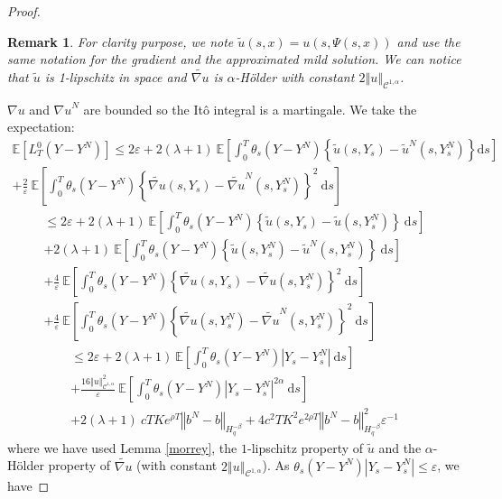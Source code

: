 \documentclass[12pt]{article}
\newtheorem{rem}{Remark}
\newcommand{\norme}[1]{\left\Vert #1\right\Vert}
\newcommand{\E}{\mathbb{E}}
\newcommand{\di}{\mathrm{d}}
\begin{document}
\begin{proof}
\begin{rem}  
    For clarity purpose, we note $\tilde{u}\left(s,x\right) = u\left(s,\Psi\left(s,x\right)\right)$ and use the same notation for the gradient and the approximated mild solution. We can notice that $\tilde{u}$ is 1-lipschitz in space and $\widetilde{\nabla u}$ is $\alpha$-Hölder with constant $2\norme{u}_{\mathcal{C}^{1,\alpha}}$.
\end{rem}
${\nabla u}$ and ${\nabla u}^N$ are bounded so the Itô integral is a martingale. We take the expectation:
    \begin{multline*}
    \E\left[L^0_T(Y-Y^N)\right] \leq 2\varepsilon + 2(\lambda + 1)\ \E\left[\int_0^T\theta_s(Y-Y^N)\left\{\widetilde{u}\left(s,Y_s\right)-\widetilde{u}^N\left(s,Y_s^N\right)\right\} \di s \right]\\
    +\frac{2}{\varepsilon}\ \E\left[\int_0^T \theta_s(Y-Y^N)\left\{\widetilde{\nabla u}\left(s,Y_s\right)-{\widetilde{\nabla u}^N}\left(s,Y_s^N\right)\right\}^2\ \di s\right]
    \end{multline*}
    \begin{multline*}
    \leq 2\varepsilon + 2(\lambda + 1)\ \E\left[\int_0^T\theta_s(Y-Y^N)\left\{\widetilde{u}\left(s,Y_s\right)-\widetilde{u}\left(s,Y_s^N\right)\right\}\ \di s \right]\\+2(\lambda + 1)\ \E\left[\int_0^T\theta_s(Y-Y^N)\left\{\widetilde{u}\left(s,Y_s^N\right)-\widetilde{u}^N\left(s,Y_s^N\right)\right\}\ \di s \right]\\
    +\frac{4}{\varepsilon}\ \E\left[\int_0^T \theta_s(Y-Y^N)\left\{\widetilde{\nabla u}\left(s,Y_s\right)-\widetilde{\nabla u}\left(s,Y_s^N\right)\right\}^2\ \di s\right]\\
    +\frac{4}{\varepsilon}\ \E\left[\int_0^T \theta_s(Y-Y^N)\left\{\widetilde{\nabla u}\left(s,Y_s^N\right)-\widetilde{\nabla u}^N\left(s,Y_s^N\right)\right\}^2\ \di s\right]
    \end{multline*}
    \begin{multline*}
    \leq 2\varepsilon + 2(\lambda + 1)\ \E\left[\int_0^T\theta_s(Y-Y^N)\left|Y_s - Y^N_s\right|\ \di s \right] \\
    +\frac{16\norme{u}_{\mathcal{C}^{1,\alpha}}^2}{\varepsilon}\ \E\left[\int_0^T \theta_s(Y-Y^N)\left|Y_s - Y^N_s\right|^{2\alpha}\ \di s\right]\\
    +2(\lambda + 1)\ cT Ke^{\rho T}\norme{b^N-b}_{H^{-\beta}_{q}} +4c^2T K^2e^{2\rho T}\norme{b^N-b}_{H^{-\beta}_{q}}^2\varepsilon^{-1}
    \end{multline*}
    where we have used Lemma \ref{morrey}, the $1$-lipschitz property of $\widetilde{u}$ and the $\alpha$-Hölder property of $\widetilde{\nabla u}$ (with constant $2\norme{u}_{\mathcal{C}^{1,\alpha}}$). As $\theta_s(Y-Y^N)\left|Y_s - Y^N_s\right|\leq \varepsilon$, we have    

\end{proof}
\end{document}
